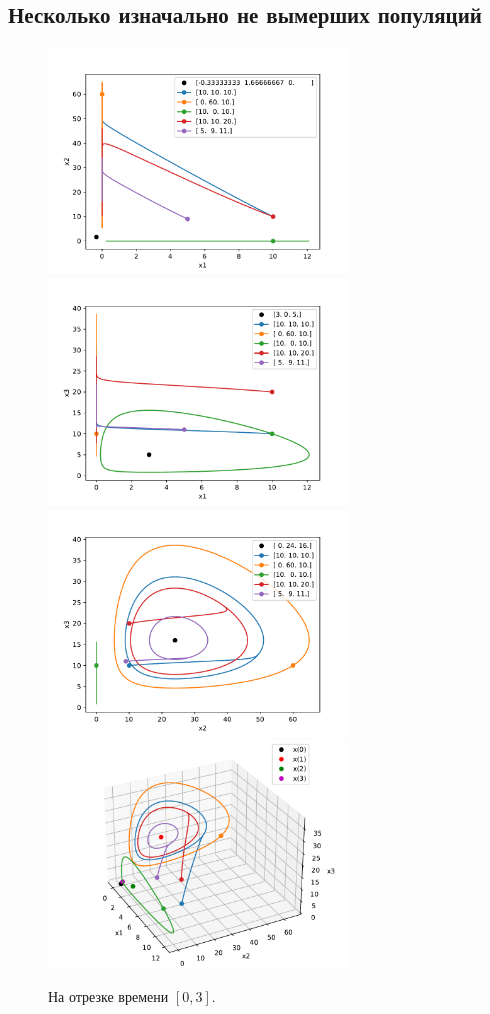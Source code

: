     \subsection{Несколько изначально не вымерших популяций}
    \begin{figure}[H]
        \centering
        \includegraphics[width=8cm]{pictures/x_12phase.pdf}
        \includegraphics[width=8cm]{pictures/x_13phase.pdf}
        \includegraphics[width=8cm]{pictures/x_23phase.pdf}
        \includegraphics[width=8cm]{pictures/x_phase3.pdf}
        \caption{На отрезке времени \( [0, 3] \).}
    \end{figure}